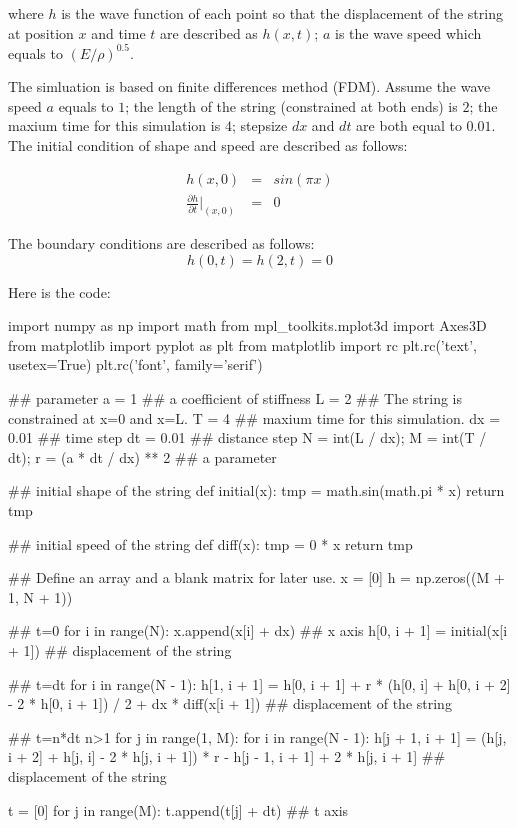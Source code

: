 where $h$ is the wave function of each point so that the displacement of the string at position $x$ and time $t$ are described as $h(x,t)$; $a$ is the wave speed which equals to $(E/\rho)^{0.5}$.

The simluation is based on finite differences method (FDM). Assume the wave speed $a$ equals to $1$; the length of the string (constrained at both ends) is $2$; the maxium time for this simulation is $4$; stepsize $dx$ and $dt$ are both equal to $0.01$. The initial condition of shape and speed are described as follows:

\begin{eqnarray}
h(x,0)&=&sin(\pi x)\\
\frac{\partial h}{\partial t}\bigg |_{(x,0)}&=&0
\end{eqnarray}

The boundary conditions are described as follows:
\begin{equation}
h(0,t)=h(2,t)=0
\end{equation}

Here is the code:
\begin{python}
	import numpy as np
	import math
	from mpl_toolkits.mplot3d import Axes3D
	from matplotlib import pyplot as plt
	from matplotlib import rc
	plt.rc('text', usetex=True)
	plt.rc('font', family='serif')

	## parameter
	a = 1  ## a coefficient of stiffness
	L = 2  ## The string is constrained at x=0 and x=L.
	T = 4  ## maxium time for this simulation.
	dx = 0.01  ## time step
	dt = 0.01  ## distance step
	N = int(L / dx);
	M = int(T / dt);
	r = (a * dt / dx) ** 2  ## a parameter
\end{python}
	
\begin{python}
	## initial shape of the string
	def initial(x):
	tmp = math.sin(math.pi * x)
	return tmp
	
	## initial speed of the string
	def diff(x):
	tmp = 0 * x
	return tmp
	
	## Define an array and a blank matrix for later use.
	x = [0]
	h = np.zeros((M + 1, N + 1))
	
	## t=0
	for i in range(N):
	x.append(x[i] + dx)  ## x axis
	h[0, i + 1] = initial(x[i + 1])  ## displacement of the string
	
	## t=dt
	for i in range(N - 1):
	h[1, i + 1] = h[0, i + 1] + r * (h[0, i] + h[0, i + 2] - 2 * h[0, i + 1]) / 2 + dx * diff(x[i + 1])
	## displacement of the string
	
	## t=n*dt n>1
	for j in range(1, M):
	for i in range(N - 1):
	h[j + 1, i + 1] = (h[j, i + 2] + h[j, i] - 2 * h[j, i + 1]) * r - h[j - 1, i + 1] + 2 * h[j, i + 1]
	## displacement of the string
	
	t = [0]
	for j in range(M):
	t.append(t[j] + dt)  ## t axis
\end{python}

